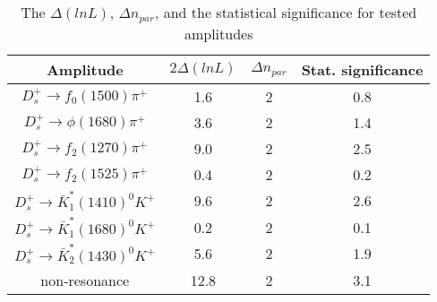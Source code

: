 {\begin{table}[htbp]
    \caption{The $\Delta(lnL)$, $\Delta n_{par}$, and the statistical significance for tested amplitudes}
    \label{test-significance-table}
    \begin{center}
        \begin{tabular}{cccc}
            \toprule
            Amplitude & $2\Delta(lnL)$ & $\Delta n_{par}$ & Stat. significance\\
            \hline
            $D_{s}^{+} \rightarrow f_{0}(1500)\pi^{+}$                     & 1.6        & 2   & 0.8\\
            $D_{s}^{+} \rightarrow \phi(1680)\pi^{+}$                      & 3.6        & 2   & 1.4\\
            $D_{s}^{+} \rightarrow f_{2}(1270)\pi^{+}$                     & 9.0        & 2   & 2.5\\
            $D_{s}^{+} \rightarrow f_{2}(1525)\pi^{+}$                     & 0.4        & 2   & 0.2\\
            $D_{s}^{+} \rightarrow \bar{K}_{1}^{*}(1410)^{0}K^{+}$         & 9.6        & 2   & 2.6\\
            $D_{s}^{+} \rightarrow \bar{K}_{1}^{*}(1680)^{0}K^{+}$         & 0.2        & 2   & 0.1\\
            $D_{s}^{+} \rightarrow \bar{K}_{2}^{*}(1430)^{0}K^{+}$         & 5.6        & 2   & 1.9\\
            non-resonance                                                  & 12.8        & 2   & 3.1\\
            \bottomrule
        \end{tabular}
    \end{center}
\end{table}

}
